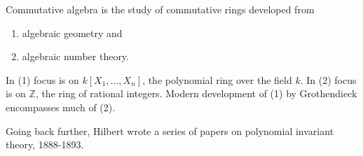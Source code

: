 Commutative algebra is the study of commutative rings developed from
\begin{enumerate}[label=(\arabic*)]
	\item algebraic geometry and
	\item algebraic number theory.
\end{enumerate}

In (1) focus is on $k[X_1, \ldots, X_n]$, the polynomial ring over the field
$k$. In (2) focus is on $\mathbb{Z}$, the ring of rational integers. Modern
development of (1) by Grothendieck encompasses much of (2).

Going back further, Hilbert wrote a series of papers on polynomial invariant
theory, 1888-1893.
